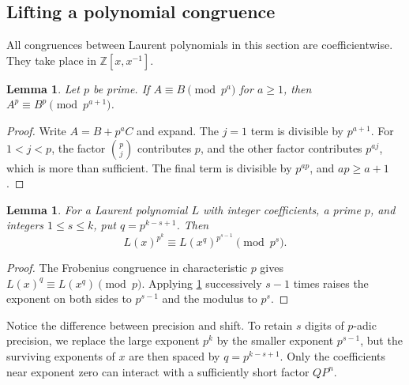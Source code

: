 \documentclass[11pt,a4paper]{article}
\numberwithin{equation}{section}
\newtheorem{lemma}[theorem]{Lemma}
\theoremstyle{definition}
\theoremstyle{remark}
\newcommand{\Z}{\mathbb Z}
\begin{document}
\subsection{Lifting a polynomial congruence}
All congruences between Laurent polynomials in this section are
coefficientwise. They take place in $\Z[x,x^{-1}]$.

\begin{lemma}\label{lem:lift}
Let $p$ be prime. If $A\equiv B\pmod{p^a}$ for $a\geq1$, then
$A^p\equiv B^p\pmod{p^{a+1}}$.
\end{lemma}
\begin{proof}
Write $A=B+p^aC$ and expand. The $j=1$ term is divisible by $p^{a+1}$.
For $1<j<p$, the factor $\binom pj$ contributes $p$, and the other
factor contributes $p^{aj}$, which is more than sufficient. The final
term is divisible by $p^{ap}$, and $ap\geq a+1$.
\end{proof}

\begin{lemma}\label{lem:spread}
For a Laurent polynomial $L$ with integer coefficients, a prime $p$, and
integers $1\leq s\leq k$, put $q=p^{k-s+1}$. Then
\begin{equation}\label{eq:spread}
 L(x)^{p^k}\equiv L(x^q)^{p^{s-1}}\pmod{p^s}.
\end{equation}
\end{lemma}
\begin{proof}
The Frobenius congruence in characteristic $p$ gives
$L(x)^q\equiv L(x^q)\pmod p$. Applying \cref{lem:lift} successively
$s-1$ times raises the exponent on both sides to $p^{s-1}$ and the
modulus to $p^s$.
\end{proof}

Notice the difference between precision and shift. To retain $s$ digits
of $p$-adic precision, we replace the large exponent $p^k$ by the smaller
exponent $p^{s-1}$, but the surviving exponents of $x$ are then spaced
by $q=p^{k-s+1}$. Only the coefficients near exponent zero can interact
with a sufficiently short factor $QP^n$.
\end{document}
